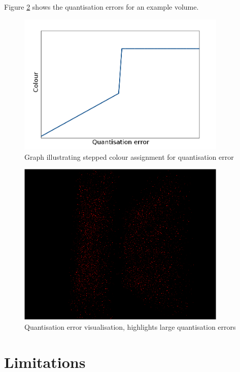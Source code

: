 Figure \ref{fig:implementation_quanterror} shows the quantisation errors for an
example volume.

\begin{figure}[h!]
  \begin{center}
    \includegraphics[width=100mm]{quant_colour_graph}
  \end{center}
  \caption{Graph illustrating stepped colour assignment for quantisation error}
  \label{fig:implementation_quantgraph}
\end{figure}

\begin{figure}[h!]
  \begin{center}
    \includegraphics[width=100mm]{quanterror}
  \end{center}
  \caption{Quantisation error visualisation, highlights large quantisation
  errors}
  \label{fig:implementation_quanterror}
\end{figure}



\section{Limitations}
\label{sec:implementation_limitations}

